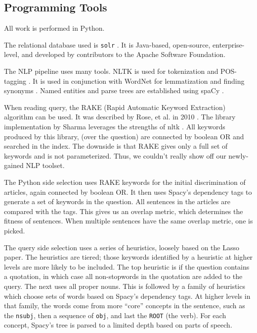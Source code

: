 \documentclass[11pt]{article}
\begin{document}
\subsection{Programming Tools}

All work is performed in Python.

The relational database used is \texttt{solr} \cite{solr}. It is Java-based, open-source, enterprise-level, and developed by contributors to the Apache Software Foundation.

The NLP pipeline uses many tools. NLTK is used for tokenization and POS-tagging \cite{nltk}. It is used in conjunction with WordNet for lemmatization and finding synonyms \cite{wordnet}. Named entities and parse trees are established using spaCy \cite{spacy2}.

When reading query, the RAKE (Rapid Automatic Keyword Extraction) algorithm can be used. It was described by Rose, et al. in 2010 \cite{rake1}. The library implementation by Sharma leverages the strengths of nltk \cite{rake2}. All keywords produced by this library, (over the question) are connected by boolean OR and searched in the index. The downside is that RAKE gives only a full set of keywords and is not parameterized. Thus, we couldn't really show off our newly-gained NLP toolset.

The Python side selection uses RAKE keywords for the initial discrimination of articles, again connected by boolean OR. It then uses Spacy's dependency tags to generate a set of keywords in the question. All sentences in the articles are compared with the tags. This gives us an overlap metric, which determines the fitness of sentences. When multiple sentences have the same overlap metric, one is picked.

The query side selection uses a series of heuristics, loosely based on the Lasso paper. The heuristics are tiered; those keywords identified by a heuristic at higher levels are more likely to be included. The top heuristic is if the question contains a quotation, in which case all non-stopwords in the quotation are added to the query. The next uses all proper nouns. This is followed by a family of heuristics which choose sets of words based on Spacy's dependency tags. At higher levels in that family, the words come from more ``core'' concepts in the sentence, such as the \texttt{nsubj}, then a sequence of \texttt{obj}, and last the \texttt{ROOT} (the verb). For each concept, Spacy's tree is parsed to a limited depth based on parts of speech. %
\end{document}
